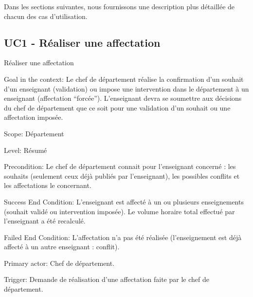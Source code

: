Dans les sections suivantes, nous fournissons une description plus détaillée de chacun des cas d'utilisation.

\subsection{UC1 - Réaliser une affectation}

\begin{usecase}{Réaliser une affectation}
	\begin{information}

 \item[Goal in the context:] Le chef de département réalise la confirmation d'un souhait d'un enseignant (validation) ou impose une intervention dans le département à un enseignant (affectation ``forcée''). 
 L'enseignant devra se soumettre aux décisions du chef de département que ce soit pour une validation d'un souhait ou une affectation imposée.

\item[Scope:] Département

 \item[{Level:}]
 Résumé

 \item[{Precondition:}]
 Le chef de département connait pour l'enseignant concerné : les souhaits (seulement ceux déjà publiés par l'enseignant), les possibles conflits et les affectations le concernant.

 \item[{Success End Condition:}]
 L'enseignant est affecté à un ou plusieurs enseignements (souhait validé ou intervention imposée). Le volume horaire total effectué par l'enseignant a été recalculé.

 \item[{Failed End Condition:}]
 L'affectation n'a pas été réalisée (l'enseignement est déjà affecté à un autre enseignant : conflit).

 \item[Primary actor:]
 Chef de département.

 \item[Trigger:]
 Demande de réalisation d'une affectation faite par le chef de département.\\


\end{information}
\end{usecase}
